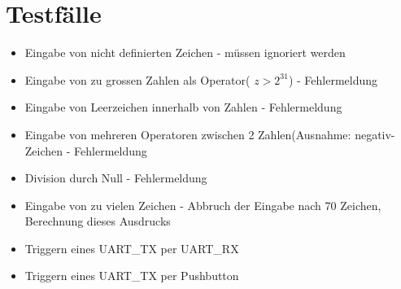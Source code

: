 \section{Testfälle}

\begin{itemize}

\item Eingabe von nicht definierten Zeichen - müssen ignoriert werden
\item Eingabe von zu grossen Zahlen als Operator( $z > 2^{31}$)  - Fehlermeldung
\item Eingabe von Leerzeichen innerhalb von Zahlen - Fehlermeldung
\item Eingabe von mehreren Operatoren zwischen 2 Zahlen(Ausnahme: negativ-Zeichen  - Fehlermeldung
\item Division durch Null - Fehlermeldung
\item Eingabe von zu vielen Zeichen - Abbruch der Eingabe nach 70 Zeichen, Berechnung dieses Ausdrucks
\item Triggern eines UART\_TX per UART\_RX
\item Triggern eines UART\_TX per Pushbutton

\end{itemize}



